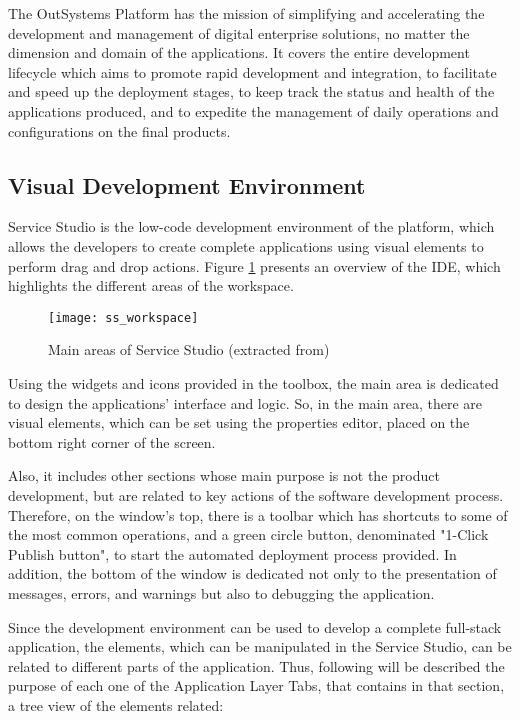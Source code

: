 The OutSystems Platform has the mission of simplifying and accelerating the development and management of digital enterprise solutions, no matter the dimension and domain of the applications. It covers the entire development lifecycle which aims to promote rapid development and integration, to facilitate and speed up the deployment stages, to keep track the status and health of the applications produced, and to expedite the management of daily operations and configurations on the final products. \cite{eg_developingWithOutsystems}

\subsection{Visual Development Environment}
\label{subsec:visual_development_environment}

Service Studio is the low-code development environment of the platform, which allows the developers to create complete applications using visual elements to perform drag and drop actions. Figure \ref{fig:ss_workspace} presents an overview of the IDE, which highlights the different areas of the workspace.

\begin{figure}[htbp]
	\centering
	\texttt{[image: ss\_workspace]}
	\caption{Main areas of Service Studio (extracted from\cite{serviceStudioOverview})}
	\label{fig:ss_workspace}
\end{figure}

Using the widgets and icons provided in the toolbox, the main area is dedicated to design the applications’ interface and logic. So, in the main area, there are visual elements, which can be set using the properties editor, placed on the bottom right corner of the screen. 

Also, it includes other sections whose main purpose is not the product development, but are related to key actions of the software development process. Therefore, on the window’s top, there is a toolbar which has shortcuts to some of the most common operations, and a green circle button, denominated "1-Click Publish button", to start the automated deployment process provided. In addition, the bottom of the window is dedicated not only to the presentation of messages, errors, and warnings but also to debugging the application.

Since the development environment can be used to develop a complete full-stack application, the elements, which can be manipulated in the Service Studio, can be related to different parts of the application. Thus, following will be described the purpose of each one of the Application Layer Tabs, that contains in that section, a tree view of the elements related:

